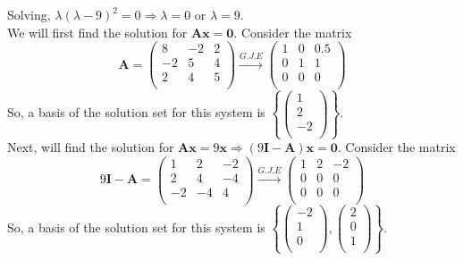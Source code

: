 \documentclass{article}
\newcommand{\bs}[1]{\boldsymbol{#1}}
\begin{document}
Solving, $\lambda(\lambda-9)^2=0 \Rightarrow \lambda=0 \text{ or } \lambda = 9$.
\newline\\
We will first find the solution for $\bs{Ax} = \bs{0}$. Consider the matrix
$$\bs{A}=\left(\begin{array}{ccc}
      8 & -2 & 2 \\
      -2 & 5 & 4 \\
      2 & 4 &  5 \\
    \end{array}\right)\xrightarrow[]{G.J.E}\left(\begin{array}{ccc}
      1 & 0 & 0.5 \\
      0 & 1 & 1 \\
      0 & 0 &  0 \\
    \end{array}\right)$$
    So, a basis of the solution set for this system is $\left\{\left(\begin{array}{c}
      1 \\
      2 \\
      -2 \\
    \end{array}\right)\right\}$.
\newline\\
Next, will find the solution for $\bs{Ax} = 9\bs{x} \Rightarrow (9\bs{I}-\bs{A})\bs{x} = \bs{0}$. Consider the matrix
$$9\bs{I}-\bs{A}=\left(\begin{array}{ccc}
      1 & 2 & -2 \\
      2 & 4 & -4 \\
      -2 & -4 &  4 \\
    \end{array}\right)\xrightarrow[]{G.J.E}\left(\begin{array}{ccc}
      1 & 2 & -2 \\
      0 & 0 & 0 \\
      0 & 0 &  0 \\
    \end{array}\right)$$
    So, a basis of the solution set for this system is $\left\{\left(\begin{array}{c}
      -2 \\
      1 \\
      0 \\
    \end{array}\right),\left(\begin{array}{c}
      2 \\
      0 \\
      1 \\
    \end{array}\right)\right\}$.
\end{document}
